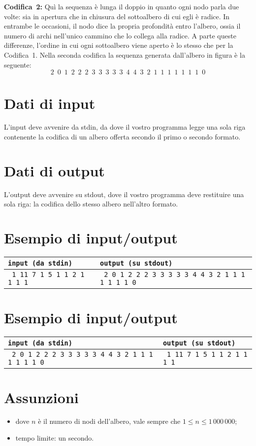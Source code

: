 \documentclass[a4paper,11pt]{article}
\newcommand{\file}[1]{\texttt{#1}}
\newcommand{\esempioA}[2]{
\noindent\begin{minipage}{\textwidth}
\begin{tabular}{|p{7cm}|p{9cm}|}
	\hline
      \textbf{\file{input (da stdin)}} & \textbf{\file{output (su stdout)}}\\
	\hline
	\tt \small #1 &
	\tt \small #2 \\
	\hline
\end{tabular}
\end{minipage}
}
\newcommand{\esempioB}[2]{
\noindent\begin{minipage}{\textwidth}
\begin{tabular}{|p{9cm}|p{7cm}|}
	\hline
      \textbf{\file{input (da stdin)}} & \textbf{\file{output (su stdout)}}\\
	\hline
	\tt \small #1 &
	\tt \small #2 \\
	\hline
\end{tabular}
\end{minipage}
}
\begin{document}
\noindent
{\bf Codifica~2:}
Quì la sequenza è lunga il doppio in quanto ogni nodo parla due volte:
sia in apertura che in chiusura del sottoalbero di cui egli è radice.
In entrambe le occasioni, il nodo dice la propria profondità entro l'albero, ossia il numero di archi nell'unico cammino che lo collega alla radice.
A parte queste differenze, l'ordine in cui ogni sottoalbero viene aperto è lo stesso che per la Codifica~1. 
Nella seconda codifica la sequenza generata dall'albero in figura è la seguente:
\[
2\,\,\,0\,\,\,1\,\,\,2\,\,\,2\,\,\,2\,\,\,3\,\,\,3\,\,\,3\,\,\,3\,\,\,3\,\,\,4\,\,\,4\,\,\,3\,\,\,2\,\,\,1\,\,\,1\,\,\,1\,\,\,1\,\,\,1\,\,\,1\,\,\,1\,\,\,0
\]	



\section*{Dati di input}

L'input deve avvenire da stdin, da dove il vostro programma legge una sola riga contenente la codifica di un albero offerta secondo il primo o secondo formato.

\section*{Dati di output}

L'output deve avvenire su stdout, dove il vostro programma deve restituire una sola riga:
la codifica dello stesso albero nell'altro formato.

\section*{Esempio di input/output}
\esempioA{
1 11 7 1 5 1 1 2 1 1 1 1
}{
2 0 1 2 2 2 3 3 3 3 3 4 4 3 2 1 1 1 1 1 1 1 0
}


\section*{Esempio di input/output}
\esempioB{
2 0 1 2 2 2 3 3 3 3 3 4 4 3 2 1 1 1 1 1 1 1 0
}{
1 11 7 1 5 1 1 2 1 1 1 1
}

\section*{Assunzioni}
\begin{itemize}[nolistsep, noitemsep]
\item dove $n$ \`e il numero di nodi dell'albero,
      vale sempre che $1 \le n \le 1\,000\,000 $;
\item tempo limite: un secondo.
\end{itemize}
\end{document}
